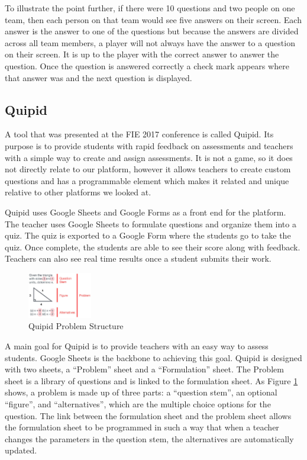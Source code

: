 \documentclass{article}
\begin{document}
        To illustrate the point further, if there were 10 questions and two people on one team, then each person on that team would see five answers on their screen. Each answer is the answer to one of the questions but because the answers are divided across all team members, a player will not always have the answer to a question on their screen. It is up to the player with the correct answer to answer the question. Once the question is answered correctly a check mark appears where that answer was and the next question is displayed.
    
    \subsection{Quipid}
        A tool that was presented at the FIE 2017 conference is called Quipid. Its purpose is to provide students with rapid feedback on assessments and teachers with a simple way to create and assign assessments. It is not a game, so it does not directly relate to our platform, however it allows teachers to create custom questions and has a programmable element which makes it related and unique relative to other platforms we looked at.
        \smallskip
        
        Quipid uses Google Sheets and Google Forms as a front end for the platform. The teacher uses Google Sheets to formulate questions and organize them into a quiz. The quiz is exported to a Google Form where the students go to take the quiz. Once complete, the students are able to see their score along with feedback. Teachers can also see real time results once a student submits their work.
        \smallskip
        \begin{figure}
            \centering
            \includegraphics[width=0.25\textwidth]{images/quipid-problem.png}
            \caption{Quipid Problem Structure \cite{quipid}}
            \label{fig:quipid-problem}
        \end{figure}
        \indent A main goal for Quipid is to provide teachers with an easy way to assess students. Google Sheets is the backbone to achieving this goal. Quipid is designed with two sheets, a ``Problem'' sheet and a ``Formulation'' sheet. The Problem sheet is a library of questions and is linked to the formulation sheet. As Figure \ref{fig:quipid-problem} shows, a problem is made up of three parts: a ``question stem'', an optional ``figure'', and ``alternatives'', which are the multiple choice options for the question. The link between the formulation sheet and the problem sheet allows the formulation sheet to be programmed in such a way that when a teacher changes the parameters in the question stem, the alternatives are automatically updated.
        \smallskip
        
\end{document}
